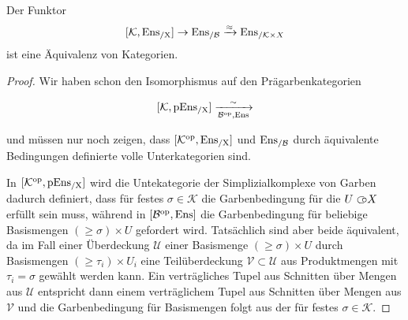 \begin{satz}
  Der Funktor
  \[
  [\mathcal{K}, \operatorname{Ens_{/X}}] \to \operatorname{Ens_{/\mathcal{B}}} \xrightarrow{\approx} \operatorname{Ens}_{/\mathcal{K} \times X}
  \]
  ist eine Äquivalenz von Kategorien.
\end{satz}
\begin{proof}
  Wir haben schon den Isomorphismus auf den Prägarbenkategorien

  \[ [\mathcal{K}, \operatorname{pEns_{/X}}] \xrightarrow[\mathcal{B}^\mathrm{op}, \operatorname{Ens}]{\sim} \]

  und müssen nur noch zeigen, dass $[\mathcal{K}^\mathrm{op}, \operatorname{Ens_{/X}}]$ und
  $\operatorname{Ens_{/\mathcal{B}}}$ durch äquivalente Bedingungen definierte volle
  Unterkategorien sind.

  In $[\mathcal{K}^\mathrm{op}, \operatorname{pEns_{/X}}]$ wird die Untekategorie der
  Simplizialkomplexe von Garben dadurch definiert, dass für festes
  $\sigma \in \mathcal{K}$ die Garbenbedingung für die $U \subset\kern-0.58em\circ X$
  erfüllt sein muss, während in $[\mathcal{B}^\mathrm{op}, \operatorname{Ens}]$ die Garbenbedingung
  für beliebige Basismengen $(\geq \sigma) \times U$ gefordert
  wird. Tatsächlich sind aber beide äquivalent, da im Fall einer
  Überdeckung $\mathcal{U}$ einer Basismenge $(\geq \sigma) \times U$
  durch Basismengen $(\geq \tau_i) \times U_i$ eine Teilüberdeckung
  $\mathcal{V} \subset \mathcal{U}$ aus Produktmengen mit $\tau_i =
  \sigma$ gewählt werden kann. Ein verträgliches Tupel aus Schnitten
  über Mengen aus $\mathcal{U}$ entspricht dann einem verträglichem
  Tupel aus Schnitten über Mengen aus $\mathcal{V}$ und die
  Garbenbedingung für Basismengen folgt aus der für festes
  $\sigma \in \mathcal{K}$.
  
\end{proof}


